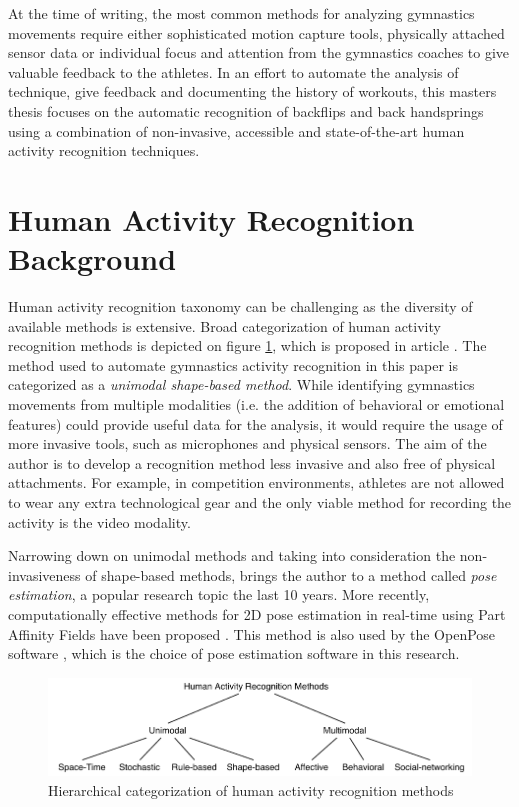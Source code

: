At the time of writing, the most common methods for analyzing gymnastics movements require either sophisticated motion capture tools, physically attached sensor data or individual focus and attention from the gymnastics coaches to give valuable feedback to the athletes. In an effort to automate the analysis of technique, give feedback and documenting the history of workouts, this masters thesis focuses on the automatic recognition of backflips and back handsprings using a combination of non-invasive, accessible and state-of-the-art human activity recognition techniques.

\section{Human Activity Recognition Background}

Human activity recognition taxonomy can be challenging as the diversity of available methods is extensive. Broad categorization of human activity recognition methods is depicted on figure \ref{har-taxonomy}, which is proposed in article \cite{10.3389/frobt.2015.00028}. The method used to automate gymnastics activity recognition in this paper is categorized as a \textit{unimodal shape-based method}. While identifying gymnastics movements from multiple modalities (i.e. the addition of behavioral or emotional features) could provide useful data for the analysis, it would require the usage of more invasive tools, such as microphones and physical sensors. The aim of the author is to develop a recognition method less invasive and also free of physical attachments. For example, in competition environments, athletes are not allowed to wear any extra technological gear and the only viable method for recording the activity is the video modality. 

Narrowing down on unimodal methods and taking into consideration the non-invasiveness of shape-based methods, brings the author to a method called \textit{pose estimation}, a popular research topic the last 10 years. More recently, computationally effective methods for 2D pose estimation in real-time using Part Affinity Fields have been proposed \cite{DBLP:journals/corr/CaoSWS16}. This method is also used by the OpenPose software \cite{DBLP:journals/corr/abs-1812-08008}, which is the choice of pose estimation software in this research. 

\begin{figure}[htb]
  \centering
    \includegraphics[width=\textwidth,keepaspectratio]
    {images/introduction/har-taxonomy}
    \caption{Hierarchical categorization of human activity recognition methods}
    \label{har-taxonomy}
\end{figure}

